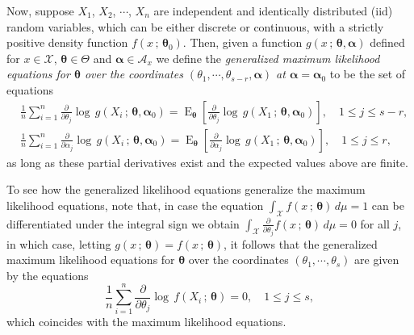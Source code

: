 \documentclass[10pt,a4paper,onecolumn]{article} %
\newcommand{\bs}{\boldsymbol}
\newcommand{\on}{\operatorname}
\begin{document}
Now, suppose $X_1$, $X_2$, $\cdots$, $X_n$ are independent and identically distributed (iid) random variables, which can be either discrete or continuous, with a strictly positive density function  $f(x\,;\,\bs{\theta}_0)$. Then, given a function $g(x\,;\,\bs{\theta},\bs{\alpha})$ defined for $x\in \mathcal{X}$, $\bs{\theta}\in \Theta$ and $\bs{\alpha}\in \mathcal{A}_x$ we define the \textit{generalized maximum likelihood equations for $\bs{\theta}$ over the coordinates $(\theta_1,\cdots,\theta_{s-r},\bs{\alpha})$ at $\bs{\alpha}=\bs{\alpha}_0$} to be the set of equations
\begin{equation}\label{modified}
\begin{aligned}
&\frac{1}{n}\sum_{i=1}^n \frac{\partial}{\partial \theta_j}  \log\, g(X_i\,;\,\bs{\theta},\bs{\alpha}_0) = \on{E}_{\bs{\theta}}\left[\frac{\partial}{\partial \theta_j}  \log\, g(X_1\,;\,\bs{\theta},\bs{\alpha}_0)\right],\quad 1\leq j\leq s-r,\\ &\frac{1}{n}
\sum_{i=1}^n \frac{\partial}{\partial \alpha_j}  \log\, g(X_i\,;\,\bs{\theta},\bs{\alpha}_0)=\on{E}_{\bs{\theta}}\left[\frac{\partial}{\partial \alpha_j}  \log\, g(X_1\,;\,\bs{\theta},\bs{\alpha}_0)\right], \quad  1\leq j\leq r,
\end{aligned}
\end{equation}
as long as these partial derivatives exist and the expected values above are finite.

To see how the generalized likelihood equations generalize the maximum likelihood equations, note that, in case the equation $\int_{\mathcal{X}} f(x\,;\,\bs{\theta})\, d\mu =1$ can be differentiated under the integral sign we obtain $\int_{\mathcal{X}} \frac{\partial}{\partial \theta_j} f(x\,;\,\bs{\theta})\, d\mu =0$ for all $j$, in which case, letting $g(x\,;\,\bs{\theta})=f(x\,;\,\bs{\theta})$, it follows that the generalized maximum likelihood equations for $\bs{\theta}$ over the coordinates $(\theta_1,\cdots,\theta_s)$ are given by the equations
\begin{equation*}
\frac{1}{n}\sum_{i=1}^n \frac{\partial}{\partial \theta_j}  \log\, f(X_i\,;\,\bs{\theta}) = 0,\quad 1\leq j\leq s,
\end{equation*}
which coincides with the maximum likelihood equations.
\end{document}
